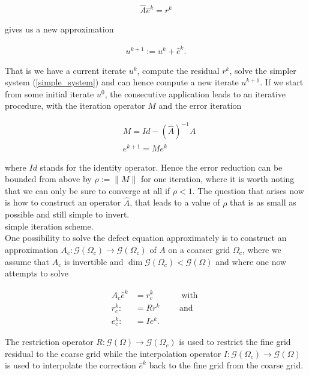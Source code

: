 \documentclass[../draft_1.tex]{subfiles}
\begin{document}
\begin{ceqn}
	\begin{align}
	\label{simple_system}
\hat{A} \hat{e}^k = r^k
	\end{align}
\end{ceqn}
gives us a new approximation 
\begin{ceqn}
	\begin{align}
	\label{update_correction}
u^{k+1} := u^k + \hat{e}^k.
	\end{align}
\end{ceqn}
That is we have a current iterate $u^k$, compute the residual $r^k$, solve the simpler system (\ref{simple_system}) and can hence compute a new iterate $u^{k+1}$. If we start from some initial iterate $u^0$, the consecutive application leads to an iterative procedure, with the iteration operator $M$ and the error iteration 
\begin{ceqn}
	\begin{align}
&M = Id - (\hat{A})^{-1} A \\
&e^{k+1} = M e^k
	\end{align}
\end{ceqn}
where $Id$ stands for the identity operator. Hence the error reduction can be bounded from above by $\rho := \| M \|$ for one iteration, where it is worth noting that we can only be sure to converge at all if $\rho < 1$.  The question that arises now is how to construct an operator $\hat{A}$, that leads to a value of $\rho$ that is as small as possible and still simple to invert. 
\smallskip 
\\
simple iteration scheme. 
\smallskip
\\
One possibility to solve the defect equation approximately is to construct an approximation $A_c: \mathcal{G}(\Omega_c) \rightarrow \mathcal{G}(\Omega_c)$ of $A$ on a coarser grid $\Omega_c$, where we assume that $A_c$ is invertible and $\dim \mathcal{G}(\Omega_c) < \mathcal{G}(\Omega)$ and where one now attempts to solve
\begin{ceqn}
	\begin{align}
	\label{coarse_grid_problem}
A_c \hat{e}^k &= r_c^k \quad \qquad \text{ with } \\
r_c^k :&= R r^k \qquad \text{ and }\\
e_c^k :&= I e^k. 
	\end{align}
\end{ceqn}
The restriction operator $R : \mathcal{G}(\Omega) \rightarrow \mathcal{G}(\Omega_c)$ is used to restrict the fine grid residual to the coarse grid while the interpolation operator $I: \mathcal{G}(\Omega_c) \rightarrow \mathcal{G}(\Omega)$ is used to interpolate the correction $ \hat{e}^k$ back to the fine grid from the coarse grid. 
\end{document}
